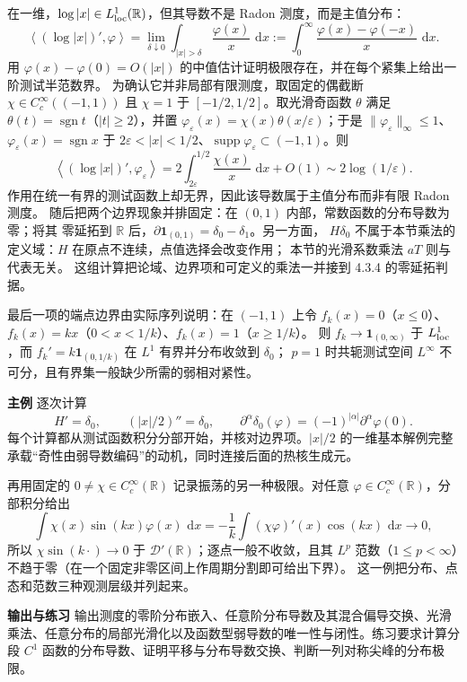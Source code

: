 \documentclass[11pt,a4paper]{ctexart}
\newcommand{\R}{\mathbb R}
\newcommand{\eps}{\varepsilon}
\newcommand{\dd}{\,\mathrm d}
\newcommand{\supp}{\operatorname{supp}}
\newcommand{\planitem}[1]{\par\smallskip\noindent\textcolor{deepblue}{\textbf{#1}}\quad}
\begin{document}
在一维，$\log|x|\in L^1_{\rm loc}(\R)$，但其导数不是 Radon 测度，而是主值分布：
\[
 \left\langle(\log|x|)',\varphi\right\rangle
 =\lim_{\delta\downarrow0}\int_{|x|>\delta}\frac{\varphi(x)}x\,\dd x
 :=\int_0^\infty\frac{\varphi(x)-\varphi(-x)}x\,\dd x.
\]
用 $\varphi(x)-\varphi(0)=O(|x|)$ 的中值估计证明极限存在，并在每个紧集上给出一阶测试半范数界。
为确认它并非局部有限测度，取固定的偶截断 $\chi\in C_c^\infty((-1,1))$ 且
$\chi=1$ 于 $[-1/2,1/2]$。取光滑奇函数 $\theta$ 满足
$\theta(t)=\operatorname{sgn}t$（$|t|\ge2$），并置
$\varphi_\eps(x)=\chi(x)\theta(x/\eps)$；于是
$\|\varphi_\eps\|_\infty\le1$、$\varphi_\eps(x)=\operatorname{sgn}x$ 于
$2\eps<|x|<1/2$、$\supp\varphi_\eps\subset(-1,1)$。则
\[
 \left\langle(\log|x|)',\varphi_\eps\right\rangle
 =2\int_{2\eps}^{1/2}\frac{\chi(x)}x\,\dd x+O(1)
 \sim2\log(1/\eps).
\]
作用在统一有界的测试函数上却无界，因此该导数属于主值分布而非有限 Radon 测度。
随后把两个边界现象并排固定：在 $(0,1)$ 内部，常数函数的分布导数为零；将其
零延拓到 $\R$ 后，$\partial\mathbf1_{(0,1)}=\delta_0-\delta_1$。另一方面，
$H\delta_0$ 不属于本节乘法的定义域：$H$ 在原点不连续，点值选择会改变作用；
本节的光滑系数乘法 $aT$ 则与代表无关。
这组计算把论域、边界项和可定义的乘法一并接到 4.3.4 的零延拓判据。

最后一项的端点边界由实际序列说明：在 $(-1,1)$ 上令
$f_k(x)=0$（$x\le0$）、$f_k(x)=kx$（$0<x<1/k$）、$f_k(x)=1$（$x\ge1/k$）。
则 $f_k\to\mathbf1_{(0,\infty)}$ 于 $L^1_{\rm loc}$，而
$f_k'=k\mathbf1_{(0,1/k)}$ 在 $L^1$ 有界并分布收敛到 $\delta_0$；
$p=1$ 时共轭测试空间 $L^\infty$ 不可分，且有界集一般缺少所需的弱相对紧性。

\planitem{主例}
逐次计算
\[
H'=\delta_0,
\qquad (|x|/2)''=\delta_0,
\qquad \partial^\alpha\delta_0(\varphi)=(-1)^{|\alpha|}\partial^\alpha\varphi(0).
\]
每个计算都从测试函数积分分部开始，并核对边界项。$|x|/2$ 的一维基本解例完整承载“奇性由弱导数编码”的动机，同时连接后面的热核生成元。

再用固定的 $0\ne\chi\in C_c^\infty(\R)$ 记录振荡的另一种极限。对任意
$\varphi\in C_c^\infty(\R)$，分部积分给出
\[
 \int \chi(x)\sin(kx)\varphi(x)\,\dd x
 =-\frac1k\int (\chi\varphi)'(x)\cos(kx)\,\dd x\longrightarrow0,
\]
所以 $\chi\sin(k\cdot)\to0$ 于 $\mathcal D'(\R)$；逐点一般不收敛，且其
$L^p$ 范数（$1\le p<\infty$）不趋于零（在一个固定非零区间上作周期分割即可给出下界）。
这一例把分布、点态和范数三种观测层级并列起来。

\planitem{输出与练习}
输出测度的零阶分布嵌入、任意阶分布导数及其混合偏导交换、光滑乘法、任意分布的局部光滑化以及函数型弱导数的唯一性与闭性。练习要求计算分段 $C^1$ 函数的分布导数、证明平移与分布导数交换、判断一列对称尖峰的分布极限。
\end{document}
